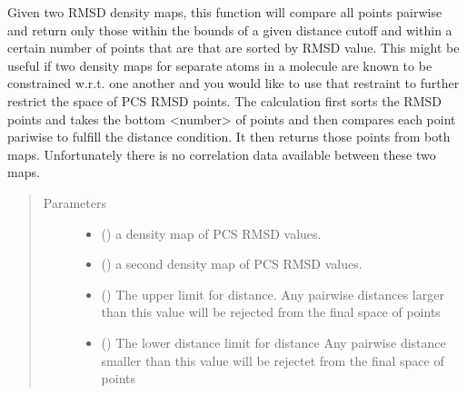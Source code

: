 \documentclass[a4paper,10pt,english,openany,oneside]{sphinxmanual}
\begin{document}
\begin{fulllineitems}
\label{\detokenize{reference/generated/paramagpy.fit.gridsearch_fit_atom_restrain_distance:paramagpy.fit.gridsearch_fit_atom_restrain_distance}}
Given two RMSD density maps, this function will compare
all points pairwise and return only those within the bounds of
a given distance cutoff and within a certain number of points
that are that are sorted by RMSD value.
This might be useful if two density maps for separate atoms
in a molecule are known to be constrained w.r.t. one another
and you would like to use that restraint to further restrict
the space of PCS RMSD points.
The calculation first sorts the RMSD points and takes the bottom
\textless{}number\textgreater{} of points and then compares each point pariwise to
fulfill the distance condition. It then returns those points
from both maps. Unfortunately there is no correlation data
available between these two maps.
\begin{quote}\begin{description}
\item[{Parameters}] \leavevmode\begin{itemize}
\item {} 
 () \textendash{} a density map of PCS RMSD values.

\item {} 
 () \textendash{} a second density map of PCS RMSD values.

\item {} 
 () \textendash{} The upper limit for distance.
Any pairwise distances larger than this value
will be rejected from the final space of points

\item {} 
 () \textendash{} The lower distance limit for distance
Any pairwise distance smaller than this value
will be rejectet from the final space of points


\end{itemize}
\end{description}
\end{quote}
\end{fulllineitems}
\end{document}
